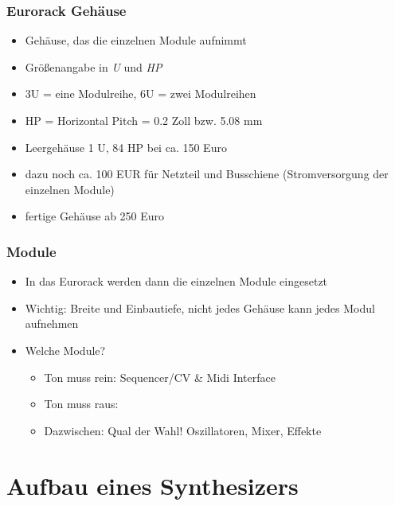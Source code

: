 \documentclass[11pt,ngerman]{beamer}
\begin{document}
\begin{frame}
\frametitle{Eurorack Gehäuse}

\begin{itemize}
\item Gehäuse, das die einzelnen Module aufnimmt
\item Größenangabe in \textit{U} und \textit{HP}
\item 3U = eine Modulreihe, 6U = zwei Modulreihen
\item HP = Horizontal Pitch = 0.2 Zoll bzw. 5.08 mm
\item Leergehäuse 1 U, 84 HP bei ca. 150 Euro
\item dazu noch ca. 100 EUR für Netzteil und Busschiene (Stromversorgung der einzelnen Module)
\item fertige Gehäuse ab 250 Euro
\end{itemize}
\end{frame}

\begin{frame}
\frametitle{Module}

\begin{itemize}
\item In das Eurorack werden dann die einzelnen Module eingesetzt
\item Wichtig: Breite und Einbautiefe, nicht jedes Gehäuse kann jedes Modul aufnehmen
\item Welche Module? 
\begin{itemize}
	\item Ton muss rein: Sequencer/CV \& Midi Interface
	\item Ton muss raus:
	\item Dazwischen: Qual der Wahl! Oszillatoren, Mixer, Effekte
\end{itemize}
\end{itemize}
\end{frame}

\section{Aufbau eines Synthesizers}
\end{document}
